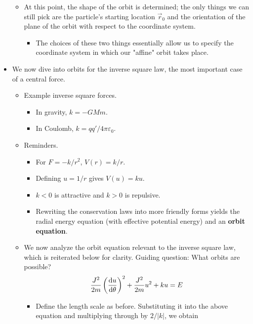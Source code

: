 \documentclass[../notes.tex]{subfiles}
\begin{document}
\begin{itemize}
\begin{itemize}
        \item At this point, the shape of the orbit is determined; the only things we can still pick are the particle's starting location $\vec{r}_0$ and the orientation of the plane of the orbit with respect to the coordinate system.
        \begin{itemize}
            \item The choices of these two things essentially allow us to specify the coordinate system in which our "affine" orbit takes place.
        \end{itemize}
    \end{itemize}
    \item We now dive into orbits for the inverse square law, the most important case of a central force.
    \begin{itemize}
        \item Example inverse square forces.
        \begin{itemize}
            \item In gravity, $k=-GMm$.
            \item In Coulomb, $k=qq'/4\pi\varepsilon_0$.
        \end{itemize}
        \item Reminders.
        \begin{itemize}
            \item For $F=-k/r^2$, $V(r)=k/r$.
            \item Defining $u=1/r$ gives $V(u)=ku$.
            \item $k<0$ is attractive and $k>0$ is repulsive.
            \item Rewriting the conservation laws into more friendly forms yields the radial energy equation (with effective potential energy) and an \textbf{orbit equation}.
        \end{itemize}
        \item We now analyze the orbit equation relevant to the inverse square law, which is reiterated below for clarity. Guiding question: What orbits are possible?
        \begin{equation*}
            \frac{J^2}{2m}\left( \dv{u}{\theta} \right)^2+\frac{J^2}{2m}u^2+ku = E
        \end{equation*}
        \begin{itemize}
            \item Define the length scale as before. Substituting it into the above equation and multiplying through by $2/|k|$, we obtain
            \begin{equation*}

\end{equation*}
\end{itemize}
\end{itemize}
\end{itemize}
\end{document}
